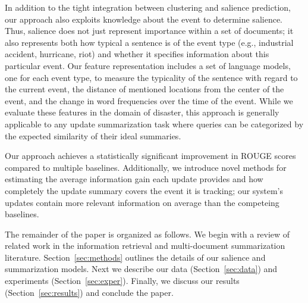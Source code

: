 In addition to the tight integration between clustering and salience
prediction, our approach also exploits knowledge about the event to determine
salience. Thus, salience does not just represent importance within a set of
documents; it also represents both how typical a sentence is of the  
event
type (e.g., industrial accident, hurricane, riot) and whether it specifies 
information
about this particular event. 
Our feature representation includes a set of language models, one for each
event type, to measure the typicality of the sentence with regard to the 
current event, the distance of mentioned locations from the center of
the event, and the change in word frequencies over the time of the event.
While we evaluate these features in the domain of disaster, this approach is generally applicable to any update summarization task where queries can be categorized by the 
expected similarity of their ideal summaries.

Our approach achieves a statistically significant improvement in 
 ROUGE scores compared to multiple baselines.
Additionally, we introduce novel methods for estimating the average information
gain each update provides and how completely the update summary covers 
the event it is tracking; our system's updates contain more relevant
information on average than the competeing baselines.


The remainder of the paper is organized as follows.
We begin with a review of related work
in the information retrieval and multi-document
summarization literature. Section~\ref{sec:methods} outlines the details
of our salience and summarization models. Next we describe our
data (Section~\ref{sec:data}) and experiments (Section~\ref{sec:exper}). Finally,
we discuss our results (Section~\ref{sec:results}) and conclude the paper.




